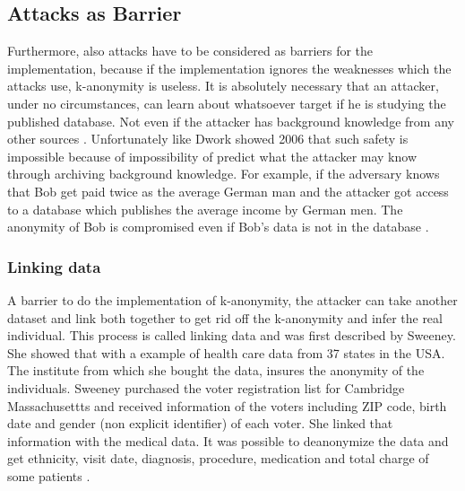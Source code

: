 \documentclass{llncs}
\begin{document}
\subsection{Attacks as Barrier}
Furthermore, also attacks have to be considered as barriers for the implementation, because if the implementation ignores the weaknesses which the attacks use, k-anonymity is useless. 
It is absolutely necessary that an attacker, under no circumstances, can learn about whatsoever target if he is studying the published database. Not even if the attacker has background knowledge from any other sources  \cite{Dalenius1977}. Unfortunately like Dwork showed 2006 that such safety is impossible because of impossibility of predict what the attacker may know through archiving background knowledge. For example, if the adversary knows that Bob get paid twice as the average German man and the attacker got access to a database which publishes the average income by German men. The anonymity of Bob is compromised even if Bob's data is not in the database \cite{dwork2011differential}.  

\subsubsection{Linking data}
A barrier to do the implementation of k-anonymity, the attacker can take another dataset and link both together to get rid off the k-anonymity and infer the real individual. This process is called linking data and was first described by Sweeney\cite{sweeney2002k}. She showed that with a example of health care data from 37 states in the USA. The institute from which she bought the data, insures the anonymity of the individuals. Sweeney purchased the voter registration list for Cambridge Massachusettts and received information of the voters including ZIP code, birth date and gender (non explicit identifier) of each voter. She linked that information with the medical data. It was possible to deanonymize the data  and get ethnicity, visit date, diagnosis, procedure, medication and total charge of some patients \cite{sweeney2002k}. 
\end{document}
